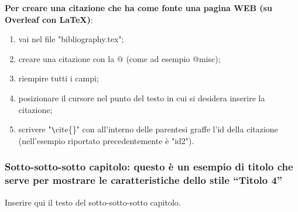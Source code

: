 \textbf{Per creare una citazione che ha come fonte una pagina WEB (su Overleaf con LaTeX)}:
\begin{enumerate}
    \item vai nel file "bibliography.tex";
    \item creare una citazione con la @ (come ad esempio @misc);
    \item riempire tutti i campi;
    \item posizionare il cursore nel punto del testo in cui si desidera inserire la citazione;
    \item scrivere "\verb|\|cite\{\}" con all'interno delle parentesi graffe l'id della citazione (nell'esempio riportato precedentemente è "id2").
\end{enumerate}

\subsubsection{Sotto-sotto-sotto capitolo: questo è un esempio di titolo che serve per mostrare le caratteristiche dello stile “Titolo 4”}

Inserire qui il testo del sotto-sotto-sotto capitolo.
